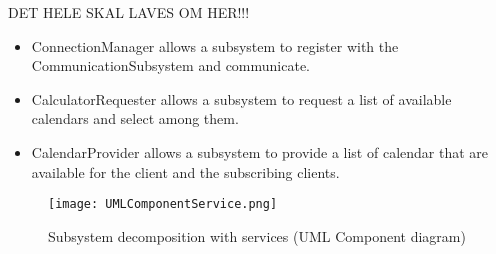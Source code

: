 DET HELE SKAL LAVES OM HER!!!

\begin{itemize}
	\item ConnectionManager allows a subsystem to register with the CommunicationSubsystem and communicate.
	\item CalculatorRequester allows a subsystem to request a list of available calendars and select among them.
	\item CalendarProvider allows a subsystem to provide a list of calendar that are available for the client and the subscribing clients. 
\end{itemize}

\begin{figure}[ht!]
\centering
\texttt{[image: UMLComponentService.png]}
\caption{Subsystem decomposition with services (UML Component diagram) \label{overflow}}
\end{figure}
